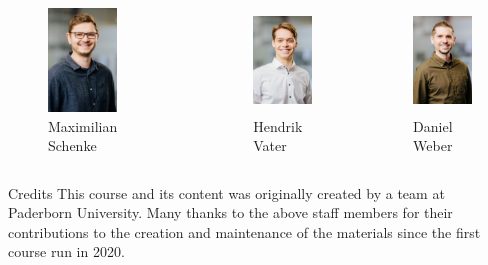 \begin{frame}
\begin{columns}[t]
	\begin{figure}
		\centering
			\includegraphics[height=2.75cm]{fig/lec01/Schenke.jpg}
			\caption*{Maximilian Schenke}
	\end{figure}
	
	\begin{figure}
		\centering
			\includegraphics[height=2.75cm]{fig/lec01/Vater.jpg}
			\caption*{Hendrik\\ Vater}
	\end{figure}

	\begin{figure}
		\centering
			\includegraphics[height=2.75cm]{fig/lec01/Weber.jpg}
			\caption*{Daniel\\ Weber}
	\end{figure}
\end{columns}
\vspace{-0.25cm}
	\begin{block}{Credits}
			This course and its content was originally created by a team at Paderborn University. Many thanks to the above staff members for their contributions to the creation and maintenance of the materials since the first course run in 2020.
	\end{block}

\end{frame}

